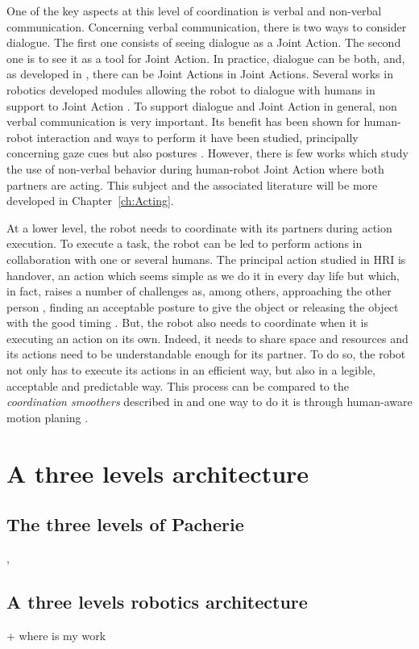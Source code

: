\documentclass[english,a4paper,11pt,twoside]{StyleThese}
\begin{document}
One of the key aspects at this level of coordination is verbal and non-verbal communication. Concerning verbal communication, there is two ways to consider dialogue. The first one consists of seeing dialogue as a Joint Action. The second one is to see it as a tool for Joint Action. In practice, dialogue can be both, and, as developed in \cite{clark1996using}, there can be Joint Actions in Joint Actions. Several works in robotics developed modules allowing the robot to dialogue with humans in support to Joint Action \cite{roy2000spoken, lucignano2013dialogue, ferreira2015users}. To support dialogue and Joint Action in general, non verbal communication is very important. Its benefit has been shown for human-robot interaction \cite{breazeal2005effects} and ways to perform it have been studied, principally concerning gaze cues \cite{boucher2010facilitative, mutlu2009footing} but also postures \cite{hart2014gesture}. However, there is few works which study the use of non-verbal behavior during human-robot Joint Action where both partners are acting. This subject and the associated literature will be more developed in Chapter~\ref{ch:Acting}.

At a lower level, the robot needs to coordinate with its partners during action execution. To execute a task, the robot can be led to perform actions in collaboration with one or several humans. The principal action studied in HRI is handover, an action which seems simple as we do it in every day life but which, in fact, raises a number of challenges as, among others, approaching the other person \cite{walters2007robotic}, finding an acceptable posture to give the object \cite{cakmak2011human, mainprice2012sharing} or releasing the object with the good timing \cite{mason2005grip}. But, the robot also needs to coordinate when it is executing an action on its own. Indeed, it needs to share space and resources and its actions need to be understandable enough for its partner. To do so, the robot not only has to execute its actions in an efficient way, but also in a legible, acceptable and predictable way. This process can be compared to the \textit{coordination smoothers} described in \cite{vesper2010minimal} and one way to do it is through human-aware motion planing \cite{sisbot2012human, kruse2013human}.


\section{A three levels architecture}

\subsection{The three levels of Pacherie}

\cite{pacherie2008phenomenology}, \cite{pacherie2011phenomenology}

\subsection{A three levels robotics architecture}

+ where is my work


\ifdefined{}
\else


\end{document}
